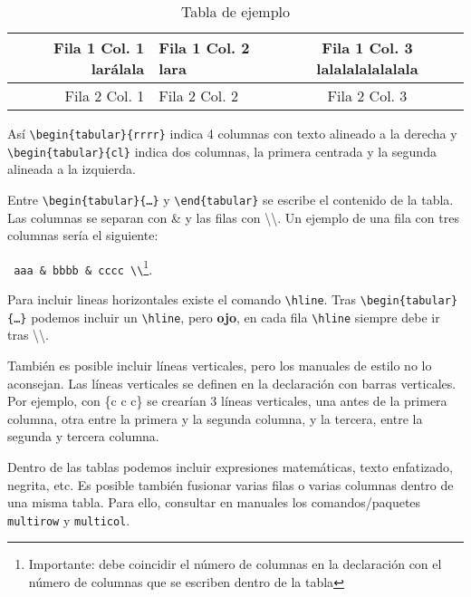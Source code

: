 \begin{table}[htp]
\caption{Tabla de ejemplo}
\label{tab:tabla_ejemplo}
\begin{center}
 \begin{tabular}{rlc}\hline
  Fila 1 Col. 1 larálala & Fila 1 Col. 2 lara & Fila 1 Col. 3  lalalalalalalala\\ \hline
  Fila 2 Col. 1 & Fila 2 Col. 2 & Fila 2 Col. 3 \\ \hline
 \end{tabular}
\end{center}
\end{table}

Así \texttt{\textbackslash begin\{tabular\}\{rrrr\}} indica 4 columnas con texto alineado a la derecha y \texttt{\textbackslash begin\{tabular\}\{cl\}} indica dos columnas, la primera centrada y la segunda alineada a la izquierda.

Entre \texttt{\textbackslash begin\{tabular\}\{\ldots\}} y \texttt{\textbackslash end\{tabular\}} se escribe el contenido de la tabla. Las columnas se separan con \& y las filas con \textbackslash \textbackslash. Un ejemplo de una fila con tres columnas sería el siguiente:
\begin{center}
 \texttt{ aaa \& bbbb \& cccc \textbackslash \textbackslash}\footnote{Importante: debe coincidir el número de columnas en la declaración con el número de columnas que se escriben dentro de la tabla}. 
\end{center}

Para incluir lineas horizontales existe el comando \texttt{\textbackslash hline}. Tras \texttt{\textbackslash begin\{tabular\}\{\ldots\}} podemos incluir un \texttt{\textbackslash hline}, pero \textbf{ojo}, en cada fila \texttt{\textbackslash hline} siempre debe ir tras \textbackslash \textbackslash.

También es posible incluir líneas verticales, pero los manuales de estilo no lo aconsejan. Las líneas verticales se definen en la declaración con barras verticales. Por ejemplo, con \{\textbar c  \textbar c \textbar c\}  se crearían 3 líneas verticales, una antes de la primera columna, otra entre la primera y la segunda columna, y la tercera, entre la segunda y tercera columna.

Dentro de las tablas podemos incluir expresiones matemáticas, texto enfatizado, negrita, etc. Es posible también fusionar varias filas o varias columnas dentro de una misma tabla. Para ello, consultar en manuales los comandos/paquetes \texttt{multirow} y \texttt{multicol}.




